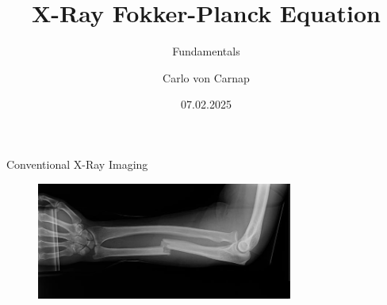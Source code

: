 \documentclass[
 ]{beamer}%
\author{Carlo von Carnap}
\title{X-Ray Fokker-Planck Equation}
\subtitle{Fundamentals}
\date[07.02.2025]{07.02.2025} %
\begin{document}
\frame{\titlepage}



\begin{frame}{Conventional X-Ray Imaging}
    \begin{figure}
        \centering
        \includegraphics[width=0.75\textwidth]{images/Broken_Arm.png}
        
        \scriptsize\cite{broken_hand}
        \label{fig:broken_arm}
    \end{figure}    
\end{frame}
\end{document}
